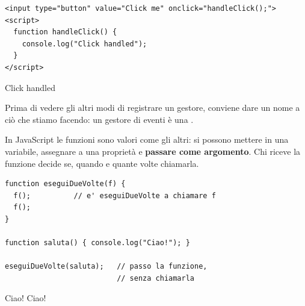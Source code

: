 \begin{affianco}[0.6][c]
\begin{lstlisting}[style=html, name=handler-attributo.html]
<input type="button" value="Click me" onclick="handleClick();">
<script>
  function handleClick() {
    console.log("Click handled");
  }
</script>
\end{lstlisting}
\risultato
\begin{browser}
\end{browser}
\begin{console}
Click handled
\end{console}
\end{affianco}

Prima di vedere gli altri modi di registrare un gestore, conviene dare un nome
a ciò che stiamo facendo: un gestore di eventi è una .


In JavaScript le funzioni sono valori come gli altri: si possono mettere in una
variabile, assegnare a una proprietà e \textbf{passare come argomento}. Chi
riceve la funzione decide se, quando e quante volte chiamarla.

\begin{affianco}[0.55][c]
\begin{lstlisting}[style=js, name=callback-base.js]
function eseguiDueVolte(f) {
  f();          // e' eseguiDueVolte a chiamare f
  f();
}

function saluta() { console.log("Ciao!"); }

eseguiDueVolte(saluta);   // passo la funzione,
                          // senza chiamarla
\end{lstlisting}
\risultato
\begin{immagine}
\end{immagine}
\begin{console}
Ciao!
Ciao!
\end{console}
\end{affianco}

